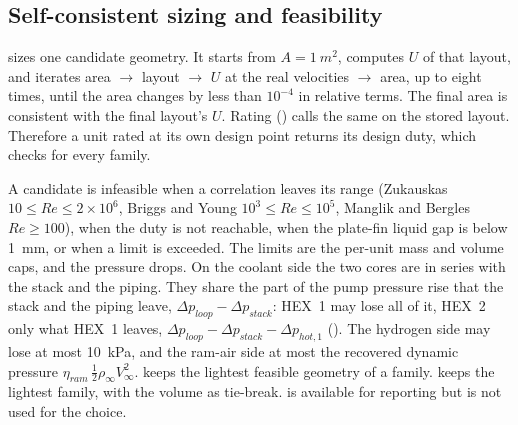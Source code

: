 \documentclass[a4paper,11pt]{article}
\begin{document}
\subsection{Self-consistent sizing and feasibility}\label{sec:selfconsistent}
 sizes one candidate geometry. It starts from
$A = \SI{1}{m^2}$, computes $U$ of that layout, and iterates
area $\to$ layout $\to$ $U$ at the real velocities $\to$ area, up to eight times, until the
area changes by less than $10^{-4}$ in relative terms. The final area is consistent with the
final layout's $U$. Rating () calls the same  on the
stored layout. Therefore a unit rated at its own design point returns its design duty, which
 checks for every family.

A candidate is infeasible when a correlation leaves its range (Zukauskas
$10 \le Re \le 2\times10^6$, Briggs and Young $10^3 \le Re \le 10^5$, Manglik and Bergles
$Re \ge 100$), when the duty is not reachable, when the plate-fin liquid gap is below
\SI{1}{mm}, or when a limit is exceeded. The limits are the per-unit mass and volume caps,
and the pressure drops. On the coolant side the two cores are in series with the stack and
the piping. They share the part of the pump pressure rise that the stack and the piping
leave, $\Delta p_{loop} - \Delta p_{stack}$: HEX~1 may lose all of it, HEX~2 only what
HEX~1 leaves, $\Delta p_{loop} - \Delta p_{stack} - \Delta p_{hot,1}$
(). The hydrogen side may lose at most \SI{10}{kPa}, and the ram-air
side at most the recovered
dynamic pressure $\eta_{ram}\,\tfrac12\rho_\infty V_\infty^2$.  keeps
the lightest feasible geometry of a family.  keeps
the lightest family, with the volume as tie-break.  is available for
reporting but is not used for the choice.
\end{document}
